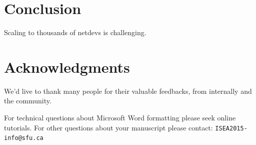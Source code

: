 \documentclass[letterpaper]{article}
\begin{document}
\section{Conclusion}
Scaling to thousands of netdevs is challenging.



\section{Acknowledgments}
We'd live to thank many people for their valuable feedbacks, from internally and the community.


For technical questions about Microsoft Word formatting please seek online tutorials. For other questions about your manuscript please contact: {\tt ISEA2015-info@sfu.ca}




\end{document}
